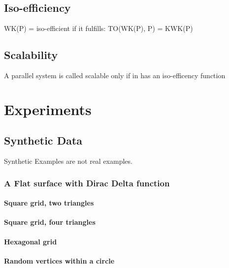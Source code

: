 \documentclass[openany]{book}
\begin{document}
\section{Iso-efficiency}
	WK(P) = iso-efficient if it fulfills:
	TO(WK(P), P) = KWK(P)~\cite[p.~350]{Lang17}



\section{Scalability}
	A parallel system is called scalable only if in has an iso-efficency function




\chapter{Experiments}
\section{Synthetic Data}
Synthetic Examples are not real examples.

\subsection{A Flat surface with Dirac Delta function}
\subsubsection{Square grid, two triangles}
\subsubsection{Square grid, four triangles}
\subsubsection{Hexagonal grid}
\subsubsection{Random vertices within a circle}
\end{document}
